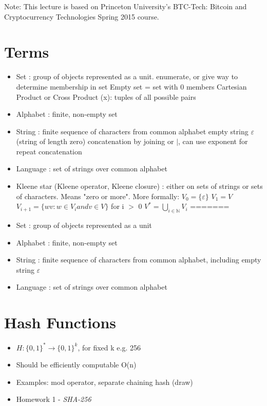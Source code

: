 \documentclass{article}
\begin{document}
\maketitle

Note: This lecture is based on Princeton University's BTC-Tech: Bitcoin and Cryptocurrency Technologies Spring 2015 course.

\section*{Terms}
\begin{itemize}
\item Set : group of objects represented as a unit. enumerate, or give way to determine membership in set
\subitem Empty set = set with 0 members
\subitem Cartesian Product or Cross Product (x): tuples of all possible pairs
\item Alphabet : finite, non-empty set
\item String : finite sequence of characters from common alphabet
\subitem empty string $\varepsilon$ (string of length zero)
\subitem concatenation by joining or $|$, can use exponent for repeat concatenation
\item Language : set of strings over common alphabet
\item Kleene star (Kleene operator, Kleene closure) : either on sets of strings or sets of characters. Means "zero or more". More formally:
\subitem $V_0 = \{\varepsilon\}$
\subitem $V_1 = V$
\subitem $V_{i+1} = \{ wv : w \in V_i and v \in V \}$ for i $>$ 0
\subitem $V^* = \bigcup\limits_{i \in \mathbb{N}} V_i$
=======
  \item Set : group of objects represented as a unit
  \item Alphabet : finite, non-empty set
  \item String : finite sequence of characters from common alphabet, including empty string $\varepsilon$
  \item Language : set of strings over common alphabet
\end{itemize}

\section*{Hash Functions}
\begin{itemize}
  \item $H: \{0,1\}^* \rightarrow \{0,1\}^k$, for fixed k e.g. 256
  \item Should be efficiently computable O(n)
  \item Examples: mod operator, separate chaining hash (draw)
  \item Homework 1 - \emph{SHA-256}
\end{itemize}
\end{document}
